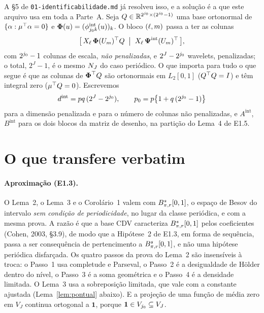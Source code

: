 \documentclass[11pt,a4paper]{article}
\newcommand{\bPsi}{\boldsymbol{\Psi}}
\newcommand{\bPhi}{\boldsymbol{\Phi}}
\newcommand{\Amat}{A}
\newcommand{\Bmat}{B}
\newcommand{\dint}{d^{\mathrm{int}}}
\newcommand{\pzero}{p_{0}}
\begin{document}
A §5 de \texttt{01-identificabilidade.md} já resolveu isso, e a solução é a
que este arquivo usa em toda a Parte~A. Seja $Q \in
\mathbb{R}^{2^{j_{0}}\times(2^{j_{0}}-1)}$ uma base ortonormal de
$\{\alpha : \mu^{\top}\alpha = 0\}$ e $\bPhi(u) =
(\phi^{\mathrm{int}}_{\jzero\tsl}(u))_{\tsl}$. O bloco $(\ell,m)$ passa a
ter as colunas
\begin{equation}
  \label{eq:bloco}
  \bigl[\,X_{\cv}\,\bPhi(U_{\md})\T Q \;\bigm|\;
  X_{\cv}\,\bPsi^{\mathrm{int}}(U_{\md})\T\,\bigr],
\end{equation}
com $2^{j_{0}}-1$ colunas de escala, \emph{não penalizadas}, e
$2^{J} - 2^{j_{0}}$ wavelets, penalizadas; o total, $2^{J}-1$, é o mesmo
$N_{J}$ do caso periódico. O que importa para tudo o que segue é que as colunas
de $\bPhi\T Q$ são ortonormais em $L_{2}[0,1]$ ($Q^{\top} Q = I$) e têm integral
zero ($\mu^{\top} Q = 0$). Escrevemos
\[
  \dint = pq\,(2^{J} - 2^{\jzero}), \qquad
  \pzero = p\bigl\{1 + q\,(2^{\jzero}-1)\bigr\}
\]
para a dimensão penalizada e para o número de colunas não penalizadas,
e $\Amat^{\mathrm{int}}$, $\Bmat^{\mathrm{int}}$ para os dois blocos da
matriz de desenho, na partição do Lema~4 de E1.5.

\section{O que transfere verbatim}

\paragraph{Aproximação (E1.3).} O Lema~2, o Lema~3 e o Corolário~1 valem com
$B^{s}_{\pi,r}[0,1]$, o espaço de Besov do intervalo \emph{sem condição de
periodicidade}, no lugar da classe periódica, e com a mesma prova. A razão é
que a base CDV caracteriza $B^{s}_{\pi,r}[0,1]$ pelos coeficientes (Cohen,
2003, \S 3.9), de modo que a Hipótese~2 de E1.3, em forma de sequência, passa
a ser consequência de pertencimento a $B^{s}_{\pi,r}[0,1]$, e não uma
hipótese periódica disfarçada. Os quatro passos da prova do Lema~2 são
insensíveis à troca: o Passo~1 usa completude e Parseval, o Passo~2 é a
desigualdade de Hölder dentro do nível, o Passo~3 é a soma geométrica e o
Passo~4 é a densidade limitada. O Lema~3 usa a sobreposição limitada, que vale
com a constante ajustada (Lema~\ref{lem:pontual} abaixo). E a projeção de uma
função de média zero em $V_{J}$ continua ortogonal a $\mathbf{1}$, porque
$\mathbf{1}\in V_{j_{0}}\subseteq V_{J}$.
\end{document}
